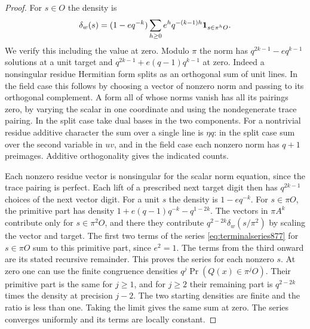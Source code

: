 \documentclass[a4paper,11pt]{article}
\theoremstyle{definition}
\theoremstyle{remark}
\numberwithin{equation}{section}
\begin{document}
\begin{proof}
For \(s\in O\) the density is
\begin{equation}
 \delta_w(s)=(1-e q^{-k})\sum_{h\ge0}
            e^h q^{-(k-1)h}{\bf1}_{s\in\pi^hO}.
 \label{eq:terminalseries877}
\end{equation}
We verify this including the value at zero. Modulo \(\pi\) the norm
has \(q^{2k-1}-e q^{k-1}\) solutions at a unit target and
\(q^{2k-1}+e(q-1)q^{k-1}\) at zero. Indeed a nonsingular residue
Hermitian form splits as an orthogonal sum of unit lines. In the
field case this follows by choosing a vector of nonzero norm
and passing to its orthogonal complement. A form all of whose
norms vanish has all its pairings zero, by varying the scalar in
one coordinate and using the nondegenerate trace pairing. In the
split case take dual bases in the two components. For a nontrivial
residue additive character the sum over a single line is \(\eta q\):
in the split case sum over the second variable in \(uv\), and in
the field case each nonzero norm has \(q+1\) preimages. Additive
orthogonality gives the indicated counts.

Each nonzero residue vector is nonsingular for the scalar norm
equation, since the trace pairing is perfect. Each lift of a
prescribed next target digit then has \(q^{2k-1}\) choices of
the next vector digit. For a unit \(s\) the density is
\(1-e q^{-k}\). For \(s\in\pi O\), the primitive part has density
\(1+e(q-1)q^{-k}-q^{1-2k}\). The vectors in \(\pi A^k\) contribute
only for \(s\in\pi^2O\), and there they contribute
\(q^{2-2k}\delta_w(s/\pi^2)\) by scaling the vector and target.
The first two terms of the series \eqref{eq:terminalseries877}
for \(s\in\pi O\) sum to this primitive part, since \(e^2=1\).
The terms from the third onward are its stated recursive
remainder. This proves the series for each nonzero \(s\).
At zero one can use the finite congruence densities
\(q^j\Pr(Q(x)\in\pi^jO)\). Their primitive part is the same for
\(j\ge1\), and for \(j\ge2\) their remaining part is \(q^{2-2k}\)
times the density at precision \(j-2\). The two starting densities
are finite and the ratio is less than one. Taking the limit gives
the same sum at zero. The series converges uniformly and its
terms are locally constant.


\end{proof}
\end{document}
